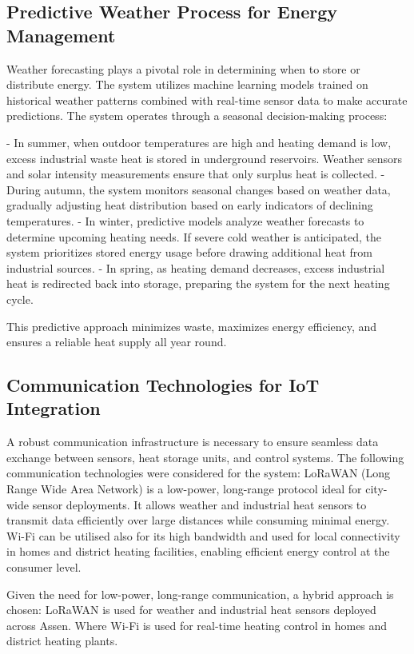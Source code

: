 \documentclass{article}
\begin{document}
\subsection{Predictive Weather Process for Energy Management}

Weather forecasting plays a pivotal role in determining when to store or distribute energy. The system utilizes machine learning models trained on historical weather patterns combined with real-time sensor data to make accurate predictions. The system operates through a seasonal decision-making process:

- In summer, when outdoor temperatures are high and heating demand is low, excess industrial waste heat is stored in underground reservoirs. Weather sensors and solar intensity measurements ensure that only surplus heat is collected.
- During autumn, the system monitors seasonal changes based on weather data, gradually adjusting heat distribution based on early indicators of declining temperatures.
- In winter, predictive models analyze weather forecasts to determine upcoming heating needs. If severe cold weather is anticipated, the system prioritizes stored energy usage before drawing additional heat from industrial sources.
- In spring, as heating demand decreases, excess industrial heat is redirected back into storage, preparing the system for the next heating cycle.

This predictive approach minimizes waste, maximizes energy efficiency, and ensures a reliable heat supply all year round.

\subsection{Communication Technologies for IoT Integration}

A robust communication infrastructure is necessary to ensure seamless data exchange between sensors, heat storage units, and control systems. The following communication technologies were considered for the system:
LoRaWAN (Long Range Wide Area Network) is a low-power, long-range protocol ideal for city-wide sensor deployments. It allows weather and industrial heat sensors to transmit data efficiently over large distances while consuming minimal energy.
Wi-Fi can be utilised also for its high bandwidth and used for local connectivity in homes and district heating facilities, enabling efficient energy control at the consumer level.

Given the need for low-power, long-range communication, a hybrid approach is chosen:
LoRaWAN is used for weather and industrial heat sensors deployed across Assen. Where Wi-Fi is used for real-time heating control in homes and district heating plants.
\end{document}
